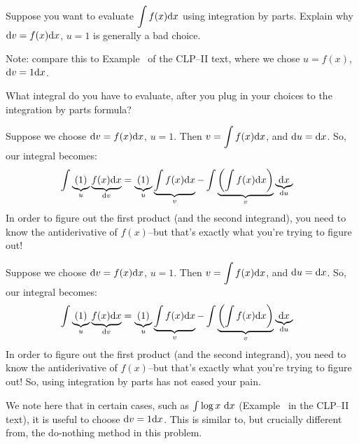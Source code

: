 \begin{question}\label{1.7_badchoices}
Suppose you want to evaluate $\displaystyle\int f(x)\mathrm{d}x$ using integration by parts. Explain why $\mathrm{d}v = f(x)\mathrm{d}x$, $u=1$ is generally a bad choice.

Note: compare this to Example~ of the CLP--II text, where we chose $u=f(x)$, $\mathrm{d}v=1\mathrm{d}x$.
\end{question}
\begin{hint}
What integral do you have to evaluate, after you plug in your choices to the integration by parts formula?
\end{hint}
\begin{answer}
Suppose we choose $\mathrm{d}v = f(x)\mathrm{d}x$, $u=1$. Then $v = \displaystyle\int f(x)\mathrm{d}x$, and $\mathrm{d}u=\mathrm{d}x$. So, our integral becomes:
\begin{align*}
\int \underbrace{(1)}_{u}\underbrace{f(x)\mathrm{d}x}_{\mathrm{d}v}&=
\underbrace{(1)}_{u}\underbrace{\int f(x)\mathrm{d}x}_{v} - \int\underbrace{ \left(\int f(x)\mathrm{d}x\right)}_{v}\underbrace{\mathrm{d}x}_{\mathrm{d}u}
\end{align*}
In order to figure out the first product (and the second integrand), you need to know the antiderivative of $f(x)$--but that's exactly what you're trying to figure out!
\end{answer}
\begin{solution}
Suppose we choose $\mathrm{d}v = f(x)\mathrm{d}x$, $u=1$. Then $v = \displaystyle\int f(x)\mathrm{d}x$, and $\mathrm{d}u=\mathrm{d}x$. So, our integral becomes:
\begin{align*}
\int \underbrace{(1)}_{u}\underbrace{f(x)\mathrm{d}x}_{\mathrm{d}v}&=
\underbrace{(1)}_{u}\underbrace{\int f(x)\mathrm{d}x}_{v} - \int\underbrace{ \left(\int f(x)\mathrm{d}x\right)}_{v}\underbrace{\mathrm{d}x}_{\mathrm{d}u}
\end{align*}
In order to figure out the first product (and the second integrand), you need to know the antiderivative of $f(x)$--but that's exactly what you're trying to figure out! So, using integration by parts has not eased your pain.

We note here that in certain cases, such as $\int\log x~ \mathrm{d}x$ (Example~  in the CLP--II text), it is useful to choose $\mathrm{d}v=1\mathrm{d}x$. This is similar to, but crucially different from, the do-nothing method in this problem.
\end{solution}



\subsection*{\Procedural}


